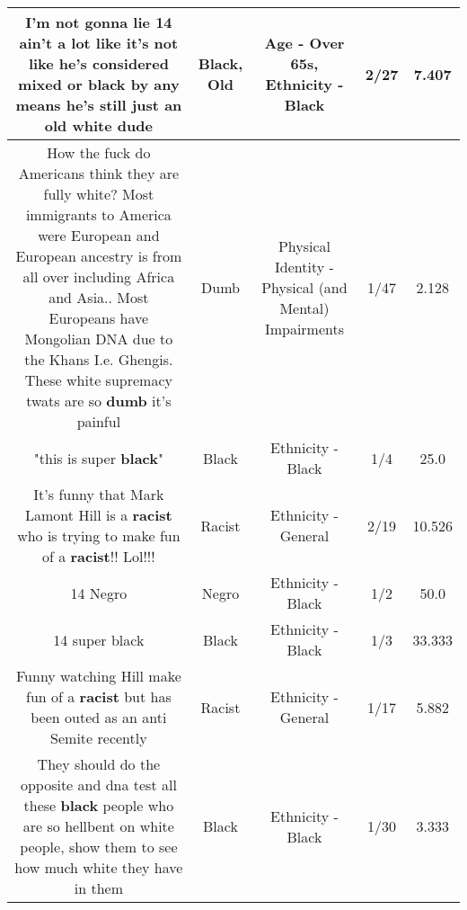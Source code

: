 \documentclass[11pt]{article}
\newlength\mylength
\begin{document}
\begin{center}
\begin{longtable}{|C{.65\mylength}|C{.30\mylength}|C{.12\mylength}|C{.12\mylength}|C{.12\mylength}|}
  \small I'm not gonna lie 14 ain't a lot like it's not like he's considered mixed or \textbf{black} by any means he's still just an \textbf{old} white dude\normalsize   & Black, Old & Age - Over 65s, Ethnicity - Black & 2/27 & 7.407 \\  \hline
  \small How the fuck do Americans think they are fully white? Most immigrants to America were European and European ancestry is from all over including Africa and Asia.. Most Europeans have Mongolian DNA due to the Khans I.e. Ghengis. These white supremacy twats are so \textbf{dumb} it's  painful\normalsize   & Dumb & Physical Identity - Physical (and Mental) Impairments & 1/47 & 2.128 \\  \hline
  \small "this is super \textbf{black}"\normalsize   & Black & Ethnicity - Black & 1/4 & 25.0 \\  \hline
  \small It's funny that Mark Lamont Hill is a \textbf{racist} who is trying to make fun of a \textbf{racist}!!  Lol!!!\normalsize   & Racist & Ethnicity - General & 2/19 & 10.526 \\  \hline
  \small 14 Negro\normalsize   & Negro & Ethnicity - Black & 1/2 & 50.0 \\  \hline
  \small 14 super black\normalsize   & Black & Ethnicity - Black & 1/3 & 33.333 \\  \hline
  \small Funny watching Hill make fun of a \textbf{racist} but has been outed as an anti Semite recently\normalsize   & Racist & Ethnicity - General & 1/17 & 5.882 \\  \hline
  \small They should do the opposite and dna test all these \textbf{black} people who are so hellbent on white people, show them to see how much white they have in them\normalsize   & Black & Ethnicity - Black & 1/30 & 3.333 \\  \hline

\end{longtable}
\end{center}
\end{document}
